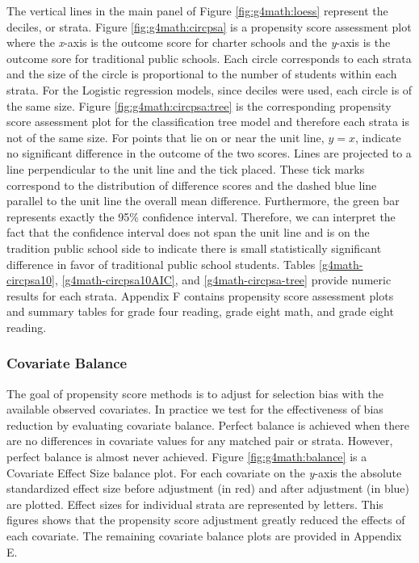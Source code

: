 \documentclass[letterpaper,12p,twoside]{article} %
\begin{document}
The vertical lines in the main panel of Figure \ref{fig:g4math:loess} represent the deciles, or strata. Figure \ref{fig:g4math:circpsa} is a propensity score assessment plot where the \textit{x}-axis is the outcome score for charter schools and the \textit{y}-axis is the outcome sore for traditional public schools. Each circle corresponds to each strata and the size of the circle is proportional to the number of students within each strata. For the Logistic regression models, since deciles were used, each circle is of the same size. Figure \ref{fig:g4math:circpsa:tree} is the corresponding propensity score assessment plot for the classification tree model and therefore each strata is not of the same size. For points that lie on or near the unit line, $y = x$, indicate no significant difference in the outcome of the two scores. Lines are projected to a line perpendicular to the unit line and the tick placed. These tick marks correspond to the distribution of difference scores and the dashed blue line parallel to the unit line the overall mean difference. Furthermore, the green bar represents exactly the 95\% confidence interval. Therefore, we can interpret the fact that the confidence interval does not span the unit line and is on the tradition public school side to indicate there is small statistically significant difference in favor of traditional public school students. Tables \ref{g4math-circpsa10}, \ref{g4math-circpsa10AIC}, and \ref{g4math-circpsa-tree} provide numeric results for each strata. Appendix F contains propensity score assessment plots and summary tables for grade four reading, grade eight math, and grade eight reading.

\subsubsection{Covariate Balance}

The goal of propensity score methods is to adjust for selection bias with the available observed covariates. In practice we test for the effectiveness of bias reduction by evaluating covariate balance. Perfect balance is achieved when there are no differences in covariate values for any matched pair or strata. However, perfect balance is almost never achieved. Figure \ref{fig:g4math:balance} is a Covariate Effect Size balance plot. For each covariate on the \textit{y}-axis the absolute standardized effect size before adjustment (in red) and after adjustment (in blue) are plotted. Effect sizes for individual strata are represented by letters. This figures shows that the propensity score adjustment greatly reduced the effects of each covariate. The remaining covariate balance plots are provided in Appendix E.
\end{document}
